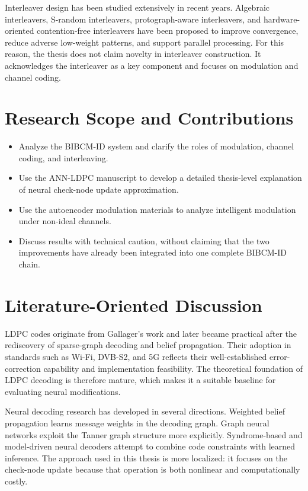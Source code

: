 Interleaver design has been studied extensively in recent years. Algebraic interleavers, S-random interleavers, protograph-aware interleavers, and hardware-oriented contention-free interleavers have been proposed to improve convergence, reduce adverse low-weight patterns, and support parallel processing. For this reason, the thesis does not claim novelty in interleaver construction. It acknowledges the interleaver as a key component and focuses on modulation and channel coding.

\section{Research Scope and Contributions}
\begin{itemize}
\item Analyze the BIBCM-ID system and clarify the roles of modulation, channel coding, and interleaving.
\end{itemize}
\begin{itemize}
\item Use the ANN-LDPC manuscript to develop a detailed thesis-level explanation of neural check-node update approximation.
\end{itemize}
\begin{itemize}
\item Use the autoencoder modulation materials to analyze intelligent modulation under non-ideal channels.
\end{itemize}
\begin{itemize}
\item Discuss results with technical caution, without claiming that the two improvements have already been integrated into one complete BIBCM-ID chain.
\end{itemize}
\section{Literature-Oriented Discussion}
LDPC codes originate from Gallager's work and later became practical after the rediscovery of sparse-graph decoding and belief propagation. Their adoption in standards such as Wi-Fi, DVB-S2, and 5G reflects their well-established error-correction capability and implementation feasibility. The theoretical foundation of LDPC decoding is therefore mature, which makes it a suitable baseline for evaluating neural modifications.

Neural decoding research has developed in several directions. Weighted belief propagation learns message weights in the decoding graph. Graph neural networks exploit the Tanner graph structure more explicitly. Syndrome-based and model-driven neural decoders attempt to combine code constraints with learned inference. The approach used in this thesis is more localized: it focuses on the check-node update because that operation is both nonlinear and computationally costly.

